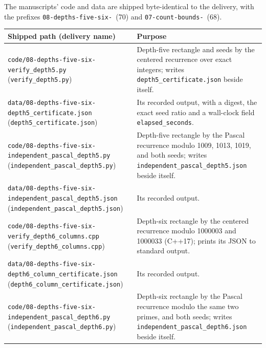 \documentclass[11pt,a4paper]{article}
\numberwithin{equation}{section}
\theoremstyle{definition}
\theoremstyle{remark}
\theoremstyle{plain}
\begin{document}
The manuscripts' code and data are shipped byte-identical to the delivery,
with the prefixes \texttt{08-depths-\allowbreak five-\allowbreak six-}~(70) and
\texttt{07-count-\allowbreak bounds-}~(68).
\begingroup
\renewcommand{\theHtable}{xxb.d56.files}%
\begin{longtable}{@{}>{\raggedright\arraybackslash}p{}>{\raggedright\arraybackslash}p{}@{}}
\toprule
Shipped path (delivery name) & Purpose\\
\midrule
\endhead
\texttt{code/08-depths-\allowbreak five-\allowbreak six-\allowbreak verify\_depth5.py} (\texttt{verify\_\allowbreak depth5.py}) & Depth-five rectangle and seeds by the centered recurrence over exact integers; writes \texttt{depth5\_\allowbreak certificate.json} beside itself.\\
\texttt{data/08-depths-\allowbreak five-\allowbreak six-\allowbreak depth5\_certificate.json} (\texttt{depth5\_\allowbreak certificate.json}) & Its recorded output, with a digest, the exact seed ratio and a wall-clock field \texttt{elapsed\_seconds}.\\
\texttt{code/08-depths-\allowbreak five-\allowbreak six-\allowbreak independent\_pascal\_depth5.py} (\texttt{independent\_\allowbreak pascal\_\allowbreak depth5.py}) & Depth-five rectangle by the Pascal recurrence modulo 1009, 1013, 1019, and both seeds; writes \texttt{independent\_\allowbreak pascal\_\allowbreak depth5.json} beside itself.\\
\texttt{data/08-depths-\allowbreak five-\allowbreak six-\allowbreak independent\_pascal\_depth5.json} (\texttt{independent\_\allowbreak pascal\_\allowbreak depth5.json}) & Its recorded output.\\
\texttt{code/08-depths-\allowbreak five-\allowbreak six-\allowbreak verify\_depth6\_columns.cpp} (\texttt{verify\_\allowbreak depth6\_\allowbreak columns.cpp}) & Depth-six rectangle by the centered recurrence modulo 1000003 and 1000033 (C++17); prints its JSON to standard output.\\
\texttt{data/08-depths-\allowbreak five-\allowbreak six-\allowbreak depth6\_column\_certificate.json} (\texttt{depth6\_\allowbreak column\_\allowbreak certificate.json}) & Its recorded output.\\
\texttt{code/08-depths-\allowbreak five-\allowbreak six-\allowbreak independent\_pascal\_depth6.py} (\texttt{independent\_\allowbreak pascal\_\allowbreak depth6.py}) & Depth-six rectangle by the Pascal recurrence modulo the same two primes, and both seeds; writes \texttt{independent\_\allowbreak pascal\_\allowbreak depth6.json} beside itself.\\

\end{longtable}
\end{document}
